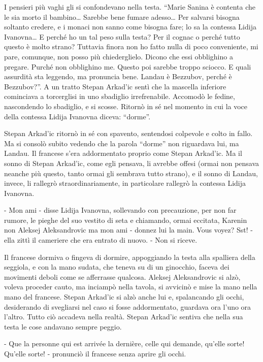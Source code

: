 I pensieri più vaghi gli si confondevano nella testa. ``Marie Sanina è contenta che le sia morto il bambino\ldots{} Sarebbe bene fumare adesso\ldots{} Per salvarsi bisogna soltanto credere, e i monaci non sanno come bisogna fare; lo sa la contessa Lidija Ivanovna\ldots{} E perché ho un tal peso sulla testa? Per il cognac o perché tutto questo è molto strano? Tuttavia finora non ho fatto nulla di poco conveniente, mi pare, comunque, non posso più chiederglielo. Dicono che essi obblighino a pregare. Purché non obblighino me. Questo poi sarebbe troppo sciocco. E quali assurdità sta leggendo, ma pronuncia bene. Landau è Bezzubov, perché è Bezzubov?''. A un tratto Stepan Arkad'ic sentì che la mascella inferiore cominciava a torcerglisi in uno sbadiglio irrefrenabile. Accomodò le fedine, nascondendo lo sbadiglio, e si scosse. Ritornò in sé nel momento in cui la voce della contessa Lidija Ivanovna diceva: ``dorme''. 

Stepan Arkad'ic ritornò in sé con spavento, sentendosi colpevole e colto in fallo. Ma si consolò subito vedendo che la parola ``dorme'' non riguardava lui, ma Landau. Il francese s'era addormentato proprio come Stepan Arkad'ic. Ma il sonno di Stepan Arkad'ic, come egli pensava, li avrebbe offesi (ormai non pensava neanche più questo, tanto ormai gli sembrava tutto strano), e il sonno di Landau, invece, li rallegrò straordinariamente, in particolare rallegrò la contessa Lidija Ivanovna. 

- Mon ami - disse Lidija Ivanovna, sollevando con precauzione, per non far rumore, le pieghe del suo vestito di seta e chiamando, ormai eccitata, Karenin non Aleksej Aleksandrovic ma mon ami - donnez lui la main. Vous voyez? Sst! - ella zittì il cameriere che era entrato di nuovo. - Non si riceve. 

Il francese dormiva o fingeva di dormire, appoggiando la testa alla spalliera della seggiola, e con la mano sudata, che teneva su di un ginocchio, faceva dei movimenti deboli come se afferrasse qualcosa. Aleksej Aleksandrovic si alzò, voleva proceder cauto, ma inciampò nella tavola, si avvicinò e mise la mano nella mano del francese. Stepan Arkad'ic si alzò anche lui e, spalancando gli occhi, desiderando di svegliarsi nel caso si fosse addormentato, guardava ora l'uno ora l'altro. Tutto ciò accadeva nella realtà. Stepan Arkad'ic sentiva che nella sua testa le cose andavano sempre peggio. 

- Que la personne qui est arrivée la dernière, celle qui demande, qu'elle sorte! Qu'elle sorte! - pronunciò il francese senza aprire gli occhi. 

